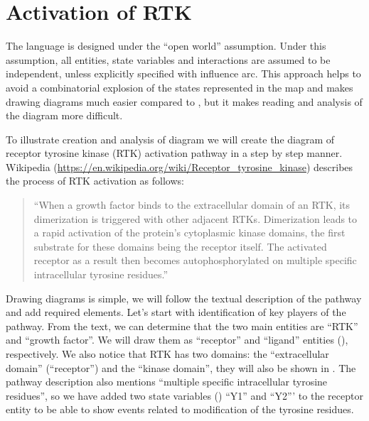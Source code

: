 \section{Activation of RTK}

The \SBGNERLone language is designed under the ``open world'' assumption. Under this assumption, all entities, state variables and interactions are assumed to be independent, unless explicitly specified with influence arc. This approach helps to avoid a combinatorial explosion of the states represented in the map and makes drawing diagrams much easier compared to \SBGNPDLone, but it makes reading and analysis of the diagram more difficult.  

To illustrate creation and analysis of \SBGNERLone diagram we will create the diagram of receptor tyrosine kinase (RTK) activation pathway in a step by step manner. Wikipedia (\url{https://en.wikipedia.org/wiki/Receptor_tyrosine_kinase}) describes the process of RTK activation as follows:
\begin{quote}
``When a growth factor binds to the extracellular domain of an RTK, its dimerization is triggered with other adjacent RTKs. Dimerization leads to a rapid activation of the protein's cytoplasmic kinase domains, the first substrate for these domains being the receptor itself. The activated receptor as a result then becomes autophosphorylated on multiple specific intracellular tyrosine residues.''
\end{quote}

Drawing \SBGNERLone diagrams is simple, we will follow the textual description of the pathway and add required elements. Let's start with identification of key players of the pathway. From the text, we can determine that the two main entities are ``RTK'' and ``growth factor''. We will draw them as ``receptor'' and ``ligand''  entities (), respectively. We also notice that RTK has two domains: the ``extracellular domain'' (``receptor'') and the ``kinase domain'', they will also be shown in . The pathway description also mentions ``multiple specific intracellular tyrosine residues'', so we have added two state variables () ``Y1'' and ``Y2''' to the receptor entity to be able to show events related to modification of the tyrosine residues.  

